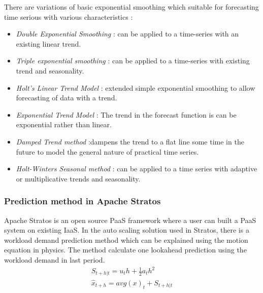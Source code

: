 There are variations of basic exponential smoothing which suitable for forecasting time serious with  various characteristics \cite{AHyndman 2013}:

\begin{itemize}
\item \textit{Double Exponential Smoothing} :  can be applied to a time-series with an existing linear trend.
\item \textit{Triple exponential smoothing} :  can be applied to a time-series with existing trend and seasonality.
\item \textit{Holt's Linear Trend Model} : extended simple exponential smoothing to allow forecasting of data with a trend.
\item \textit{Exponential Trend Model} : The trend in the forecast function is can be exponential rather than linear.
\item \textit{Damped Trend method}  :dampens the trend to a flat line some time in the future to model the general nature of practical time series.
\item  \textit{Holt-Winters Seasonal method} : can be applied to a time series with adaptive or multiplicative trends and seasonality.
\end{itemize}


\subsubsection{Prediction method in Apache Stratos}
Apache Stratos is an open source PaaS framework where a user can built a PaaS system on existing IaaS. In the auto scaling solution used in Stratos, there is a workload demand prediction method which can be explained using the motion equation in physics. The method calculate one lookahead prediction using the workload demand in last period\cite{StratosModel}.
\begin{eqnarray}
S_{t+h|t} = u_{t}h+ \frac{1}{2} a_{t}h^2 \\
\hat{x}_{t+h}=avg(x)_{t}  + S_{t+h|t} 
\end{eqnarray}


